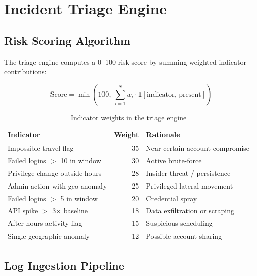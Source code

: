 \documentclass[12pt,a4paper]{article}
\begin{document}
\section{Incident Triage Engine}

\subsection{Risk Scoring Algorithm}

The triage engine computes a 0--100 risk score by summing weighted indicator contributions:

\begin{equation}
\text{Score} = \min\!\left(100,\ \sum_{i=1}^{N} w_i \cdot \mathbf{1}[\text{indicator}_{i} \text{ present}]\right)
\end{equation}

\begin{table}[H]
\centering
\caption{Indicator weights in the triage engine}
\begin{tabular}{lrl}
\toprule
\textbf{Indicator} & \textbf{Weight} & \textbf{Rationale} \\
\midrule
Impossible travel flag              & 35 & Near-certain account compromise \\
Failed logins $>$ 10 in window      & 30 & Active brute-force \\
Privilege change outside hours      & 28 & Insider threat / persistence \\
Admin action with geo anomaly       & 25 & Privileged lateral movement \\
Failed logins $>$ 5 in window       & 20 & Credential spray \\
API spike $>$ 3$\times$ baseline    & 18 & Data exfiltration or scraping \\
After-hours activity flag           & 15 & Suspicious scheduling \\
Single geographic anomaly           & 12 & Possible account sharing \\
\bottomrule
\end{tabular}
\end{table}

\subsection{Log Ingestion Pipeline}
\end{document}
